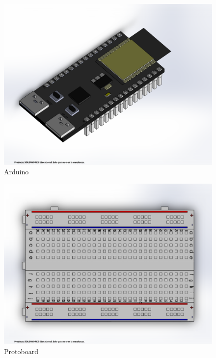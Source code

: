     \begin{figure}[H]
        \centering
        \includegraphics[trim = {1mm 1mm 1mm 10mm},clip,scale=0.2]{8/Img/Arduino.pdf}
        \caption{Arduino}
        \label{fig:enter-label}
    \end{figure}
    
    \begin{figure}[H]
        \centering
        \includegraphics[trim = {40mm 20mm 20mm 20mm},clip,scale=0.2]{8/Img/Protoboard.pdf}
        \caption{Protoboard}
        \label{fig:enter-label}
    \end{figure}
    
